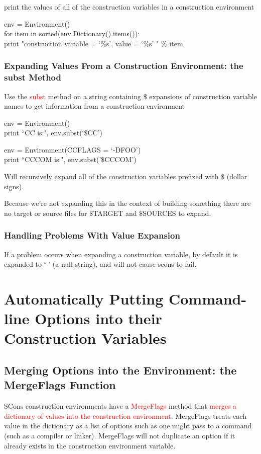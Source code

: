 \documentclass[12pt,a4paper]{article}
\begin{document}
print the values of all of the construction variables in a construction environment

env = Environment() \\
for item in sorted(env.Dictionary().items()): \\
    print "construction variable = `$\%$s', value = `$\%$s' " $\%$ item

\subsubsection{Expanding Values From a Construction Environment: the subst Method}
Use the \textcolor{red}{subst} method on a string containing $\$$ expansions of construction variable names to get information from a construction environment

env = Environment() \\
print ``CC is:", env.subst(`$\$$CC')


env = Environment(CCFLAGS = `-DFOO') \\
print ``CCCOM is:", env.subst('$\$$CCCOM')

Will recursively expand all of the construction variables prefixed with $\$$ (dollar signs).

Because we're not expanding this in the context of building something there are no target or source files for $\$$TARGET and $\$$SOURCES to expand.

\subsubsection{Handling Problems With Value Expansion}
If a problem occurs when expanding a construction variable, by default it is expanded to `  ' (a null string), and will not cause scons to fail.

\section{Automatically Putting Command-line Options into their Construction Variables}
\subsection{Merging Options into the Environment: the MergeFlags Function}
SCons construction environments have a \textcolor{red}{MergeFlags} method that \textcolor{red}{merges a dictionary of values into the construction  environment}. MergeFlags treats each value in the dictionary as a list of options such as one might pass to a command (such as a compiler or linker). MergeFlags will not duplicate an option if it already exists in the construction environment variable.
\end{document}
